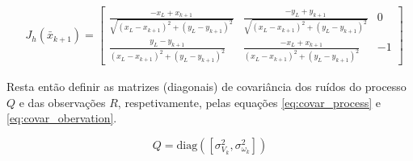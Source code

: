 \documentclass{article}
\begin{document}
\begin{equation}
    \begin{split}
        &J_h(\bar{x}_{k+1}) = 
        \left[\begin{matrix}\frac{- x_{L} + x_{k+1}}{\sqrt{\left(x_{L} - x_{k+1}\right)^{2} + \left(y_{L} - y_{k+1}\right)^{2}}} & \frac{- y_{L} + y_{k+1}}{\sqrt{\left(x_{L} - x_{k+1}\right)^{2} + \left(y_{L} - y_{k+1}\right)^{2}}} & 0\\\frac{y_{L} - y_{k+1}}{\left(x_{L} - x_{k+1}\right)^{2} + \left(y_{L} - y_{k+1}\right)^{2}} & \frac{- x_{L} + x_{k+1}}{\left(x_{L} - x_{k+1}\right)^{2} + \left(y_{L} - y_{k+1}\right)^{2}} & -1\end{matrix}\right]
    \end{split}
    \label{eq:sensor_model_jacobian}
\end{equation}

Resta então definir as matrizes (diagonais) de covariância dos ruídos do processo $Q$ e das observações $R$, respetivamente, pelas equações \ref{eq:covar_process} e \ref{eq:covar_obervation}. 

\begin{equation}
    Q = \text{diag}([\sigma_{V_k}^2, \sigma_{\omega_k}^2])
    \label{eq:covar_process}
\end{equation}
\end{document}
